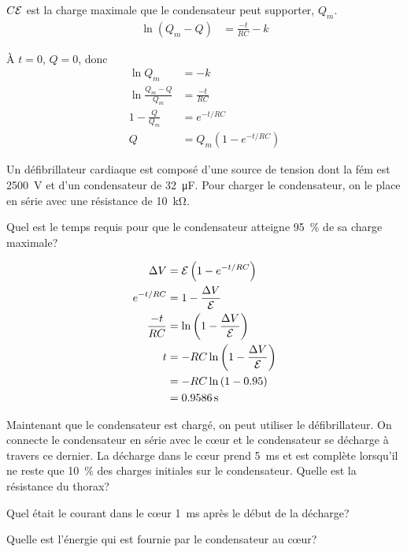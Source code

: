 $C\mathcal{E}$ est la charge maximale que le condensateur peut supporter, $Q_m$.
\begin{align*}
  \ln (Q_m - Q) &= \frac{-t}{RC} - k
\end{align*}

À $t = 0$, $Q = 0$, donc
\begin{align*}
  \ln Q_m &= -k \\
  \ln \frac{Q_m - Q}{Q_m} &= \frac{-t}{RC} \\
  1 - \frac{Q}{Q_m} &= e^{-t/RC} \\
  Q &= Q_m \left( 1 - e^{-t/RC} \right)
\end{align*}


\begin{diapobox}
  Un défibrillateur cardiaque est composé d'une source de tension dont la fém est
  \SI{2500}{V} et d'un condensateur de \SI{32}{\micro\farad}. Pour charger le
  condensateur, on le place en série avec une résistance de \SI{10}{\kilo\ohm}.

  Quel est le temps requis pour que le condensateur atteigne \SI{95}{\percent} de
  sa charge maximale?
\end{diapobox}

\begin{reponsebox}
\begin{align*}
  \Delta V &= \mathcal{E} \left( 1 - e^{-t/RC} \right)  \\
  e^{-t/RC} &= 1 - \frac{\Delta V}{\mathcal{E}}  \\
  \frac{-t}{RC} &= \ln\left( 1 - \frac{\Delta V}{\mathcal{E}} \right)  \\
  t &= -RC \ln\left( 1 - \frac{\Delta V}{\mathcal{E}} \right)  \\
    &= -RC \ln\left( 1 - \num{0.95} \right)  \\
    &= \SI{0.9586}{s}
\end{align*}
\end{reponsebox}

\begin{diapobox}
  Maintenant que le condensateur est chargé, on peut utiliser le défibrillateur.
  On connecte le condensateur en série avec le c\oe ur et le condensateur se
  décharge à travers ce dernier. La décharge dans le c\oe ur prend \SI{5}{ms} et
  est complète lorsqu'il ne reste que \SI{10}{\percent} des charges initiales
  sur le condensateur. Quelle est la résistance du thorax?

  Quel était le courant dans le c\oe ur \SI{1}{ms} après le
  début de la décharge?

  Quelle est l'énergie qui est fournie par le condensateur au c\oe ur?
\end{diapobox}

